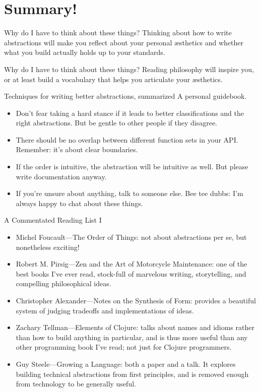 \documentclass[aspectratio=169]{beamer}
\begin{document}
  \section{Summary!}
  \begin{frame}{Why do I have to think about these things?}
    Thinking about how to write abstractions will make you reflect about your
    personal æsthetics and whether what you build actually holds up to your
    standards.
  \end{frame}
  \begin{frame}{Why do I have to think about these things?}
    Reading philosophy will inspire you, or at least build a vocabulary that
    helps you articulate your æsthetics.
  \end{frame}
  \begin{frame}{Techniques for writing better abstractions, summarized}
    A personal guidebook.
    \begin{itemize}
      \item Don’t fear taking a hard stance if it leads to better
            classifications and the right abstractions. But be gentle to
            other people if they disagree.
      \item There should be no overlap between different function sets in
            your API. Remember: it’s about clear boundaries.
      \item If the order is intuitive, the abstraction will be intuitive as
            well. But please write documentation anyway.
      \item If you’re unsure about anything, talk to someone else. Bee tee
            dubbs: I’m always happy to chat about these things.
    \end{itemize}
  \end{frame}
  \begin{frame}{A Commentated Reading List I}
    \begin{itemize}
      \item Michel Foucault—The Order of Things: not about abstractions per se,
            but nonetheless exciting!
      \item Robert M. Pirsig—Zen and the Art of Motorcycle Maintenance: one of
            the best books I’ve ever read, stock-full of marvelous writing,
            storytelling, and compelling philosophical ideas.
      \item Christopher Alexander—Notes on the Synthesis of Form: provides a
            beautiful system of judging tradeoffs and implementations of ideas.
      \item Zachary Tellman—Elements of Clojure: talks about names and idioms
            rather than how to build anything in particular, and is thus more
            useful than any other programming book I’ve read; not just for
            Clojure programmers.
      \item Guy Steele—Growing a Language: both a paper and a talk. It explores
            building technical abstractions from first principles, and is
            removed enough from technology to be generally useful.
    \end{itemize}
  \end{frame}
\end{document}

